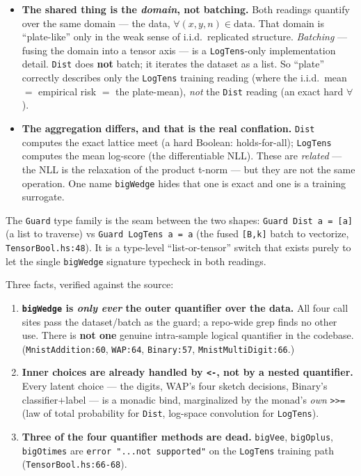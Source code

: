 \documentclass[11pt]{article}
\newcommand{\code}[1]{\texttt{#1}}
\begin{document}
\begin{itemize}
  \item \textbf{The shared thing is the \emph{domain}, not batching.} Both readings quantify over the
        same domain --- the data, $\forall(x,y,n)\in\text{data}$. That domain is ``plate-like'' only in the
        weak sense of i.i.d.\ replicated structure. \emph{Batching} --- fusing the domain into a tensor
        axis --- is a \code{LogTens}-only implementation detail. \code{Dist} does \textbf{not} batch; it
        iterates the dataset as a list. So ``plate'' correctly describes only the \code{LogTens} training
        reading (where the i.i.d.\ mean $=$ empirical risk $=$ the plate-mean), \emph{not} the \code{Dist}
        reading (an exact hard $\forall$).
  \item \textbf{The aggregation differs, and that is the real conflation.} \code{Dist} computes the exact
        lattice meet (a hard Boolean: holds-for-all); \code{LogTens} computes the mean log-score (the
        differentiable NLL). These are \emph{related} --- the NLL is the relaxation of the product t-norm
        --- but they are not the same operation. One name \code{bigWedge} hides that one is exact and one is
        a training surrogate.
\end{itemize}

\noindent The \code{Guard} type family is the seam between the two shapes:
\code{Guard Dist a = [a]} (a list to traverse) vs \code{Guard LogTens a = a} (the fused \code{[B,k]} batch
to vectorize, \code{TensorBool.hs:48}). It is a type-level ``list-or-tensor'' switch that exists purely to
let the single \code{bigWedge} signature typecheck in both readings.

Three facts, verified against the source:

\begin{enumerate}
  \item \textbf{\code{bigWedge} is \emph{only ever} the outer quantifier over the data.} All four call
        sites pass the dataset/batch as the guard; a repo-wide grep finds no other use. There is
        \textbf{not one} genuine intra-sample logical quantifier in the codebase.
        (\code{MnistAddition:60}, \code{WAP:64}, \code{Binary:57}, \code{MnistMultiDigit:66}.)
  \item \textbf{Inner choices are already handled by \code{<-}, not by a nested quantifier.} Every latent
        choice --- the digits, WAP's four sketch decisions, Binary's classifier$+$label --- is a monadic
        bind, marginalized by the monad's \emph{own} \code{>>=} (law of total probability for \code{Dist},
        log-space convolution for \code{LogTens}).
  \item \textbf{Three of the four quantifier methods are dead.} \code{bigVee}, \code{bigOplus},
        \code{bigOtimes} are \code{error "...not supported"} on the \code{LogTens} training path
        (\code{TensorBool.hs:66-68}).
\end{enumerate}
\end{document}
